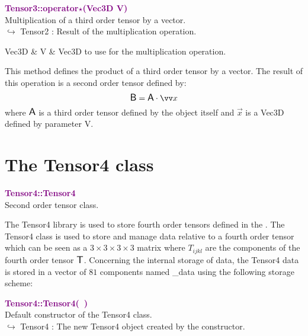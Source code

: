 \textcolor{purple}{\textbf{Tensor3::operator$\star$(Vec3D V)}}\label{Tensor3::operator*(Vec3D V)}\\
Multiplication of a third order tensor by a vector.\\ \hspace*{10mm}$\hookrightarrow$ Tensor2 : Result of the multiplication operation.

\begin{tcolorbox}[width=\textwidth,myArgs,tabularx={ll|R}]
Vec3D & V & Vec3D to use for the multiplication operation.
\end{tcolorbox}

This method defines the product of a third order tensor by a vector.
The result of this operation is a second order tensor defined by:
\begin{equation*}
\B = \A \cdot \overrightarrow{x}
\end{equation*}
where $\mbox{\large\ensuremath{\mathsf{A}}}$ is a third order tensor defined by the object itself and $\overrightarrow{x}$ is a Vec3D defined by parameter V.

\section{The Tensor4 class}

\textcolor{purple}{\textbf{Tensor4::Tensor4}}\label{Tensor4::Tensor4}\\
Second order tensor class.

The Tensor4 library is used to store fourth order tensors defined in the \DynELA.
The Tensor4 class is used to store and manage data relative to a fourth order tensor which can be seen as a $3\times3\times3\times3$ matrix where $T_{ijkl}$ are the components of the fourth order tensor $\mbox{\large\ensuremath{\mathsf{T}}}$.
Concerning the internal storage of data, the Tensor4 data is stored in a vector of $81$ components named \textsf{\_data} using the following storage scheme:



\textcolor{purple}{\textbf{Tensor4::Tensor4(~)}}\label{Tensor4::Tensor4()}\\
Default constructor of the Tensor4 class.\\ \hspace*{10mm}$\hookrightarrow$ Tensor4 : The new Tensor4 object created by the constructor.

